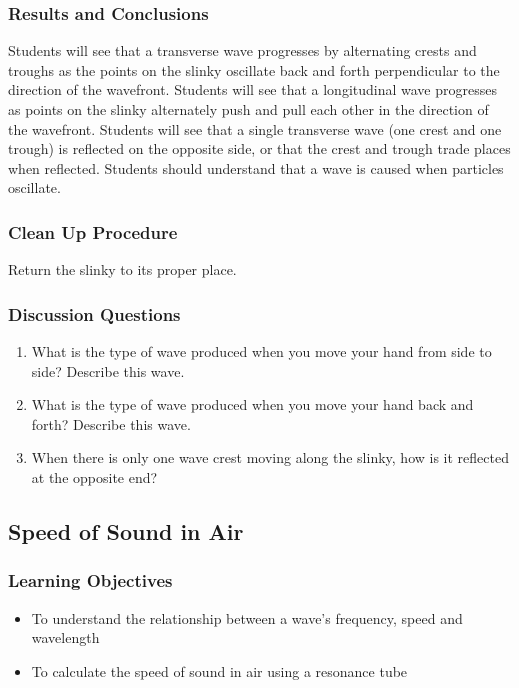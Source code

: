\subsubsection*{Results and Conclusions}
Students will see that a transverse wave progresses by alternating crests and troughs as the points on the slinky oscillate back and forth perpendicular to the direction of the wavefront.  
Students will see that a longitudinal wave progresses as points on the slinky alternately push and pull each other in the direction of the wavefront.  
Students will see that a single transverse wave (one crest and one trough) is reflected on the opposite side, or that the crest and trough trade places when reflected.  
Students should understand that a wave is caused when particles oscillate.  

\subsubsection*{Clean Up Procedure}
Return the slinky to its proper place.

\subsubsection*{Discussion Questions}
\begin{enumerate}
\item{What is the type of wave produced when you move your hand from side to side? Describe this wave.} 
\item{What is the type of wave produced when you move your hand back and forth? Describe this wave.} 
\item{When there is only one wave crest moving along the slinky, how is it reflected at the opposite end?}
\end{enumerate}


\subsection{Speed of Sound in Air}

\subsubsection*{Learning Objectives}
\begin{itemize}
\item{To understand the relationship between a wave's frequency, speed and wavelength} 
\item{To calculate the speed of sound in air using a resonance tube} 
\end{itemize}

